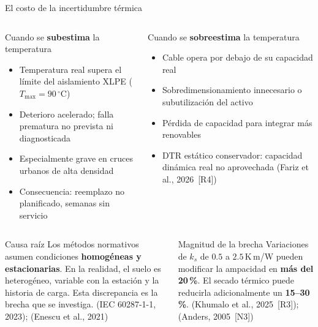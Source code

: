 \documentclass[aspectratio=169]{beamer}
\newcommand{\refcite}[1]{{\footnotesize\color{gray!70!black} #1}}
\begin{document}
\begin{frame}{El costo de la incertidumbre térmica}
\begin{columns}[T]
\begin{alertblock}{Cuando se \textbf{subestima} la temperatura}
\scriptsize
\begin{itemize}[leftmargin=*,itemsep=1pt]
  \item Temperatura real supera el límite del aislamiento XLPE ($T_{\max} = 90\,^{\circ}$C)
  \item Deterioro acelerado; falla prematura no prevista ni diagnosticada
  \item Especialmente grave en cruces urbanos de alta densidad
  \item Consecuencia: reemplazo no planificado, semanas sin servicio
\end{itemize}
\end{alertblock}

\begin{exampleblock}{Cuando se \textbf{sobreestima} la temperatura}
\scriptsize
\begin{itemize}[leftmargin=*,itemsep=1pt]
  \item Cable opera por debajo de su capacidad real
  \item Sobredimensionamiento innecesario o subutilización del activo
  \item Pérdida de capacidad para integrar más renovables
  \item DTR estático conservador: capacidad dinámica real no aprovechada
  \refcite{(Fariz et al., 2026~[R4])}
\end{itemize}
\end{exampleblock}
\end{columns}

\vspace{0.4em}
\begin{columns}[T]
\begin{block}{Causa raíz}
\scriptsize Los métodos normativos asumen condiciones \textbf{homogéneas y estacionarias}.
En la realidad, el suelo es heterogéneo, variable con la estación y la historia de carga.
Esta discrepancia es la brecha que se investiga.
\refcite{(IEC 60287-1-1, 2023); (Enescu et al., 2021)}
\end{block}

\begin{block}{Magnitud de la brecha}
\scriptsize Variaciones de $k_s$ de $0.5$ a $2.5$\,K\,m/W pueden modificar la
ampacidad en \textbf{más del 20\,\%}. El secado térmico puede reducirla
adicionalmente un \textbf{15--30\,\%}.
\refcite{(Khumalo et al., 2025~[R3]); (Anders, 2005~[N3])}
\end{block}
\end{columns}
\end{frame}
\end{document}
